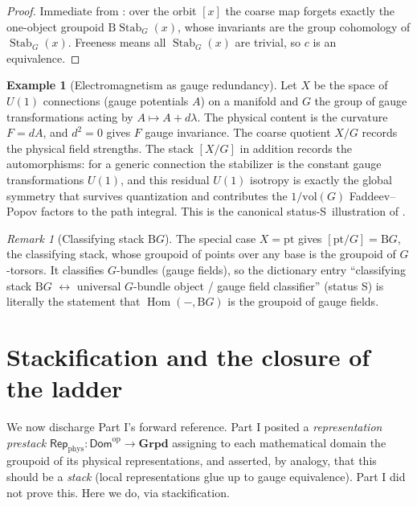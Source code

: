 \documentclass[12pt]{article}
\theoremstyle{definition}
\newtheorem{example}[theorem]{Example}
\theoremstyle{remark}
\newtheorem{remark}[theorem]{Remark}
\newcommand{\Dom}{\mathsf{Dom}}
\newcommand{\Grpd}{\mathbf{Grpd}}
\newcommand{\Repp}{\mathsf{Rep}_{\mathrm{phys}}}
\newcommand{\Stab}{\operatorname{Stab}}
\newcommand{\Hom}{\operatorname{Hom}}
\newcommand{\op}{\mathrm{op}}
\newcommand{\quot}[2]{[#1/#2]}
\newcommand{\Ss}{\textsf{S}}
\begin{document}
\begin{proof}
Immediate from : over the orbit $[x]$ the coarse map forgets exactly
the one-object groupoid $\mathrm{B}\Stab_G(x)$, whose invariants are the group
cohomology of $\Stab_G(x)$. Freeness means all $\Stab_G(x)$ are trivial, so $c$ is an
equivalence.
\end{proof}

\begin{example}[Electromagnetism as gauge redundancy]
\label{ex:em}
Let $X$ be the space of $U(1)$ connections (gauge potentials $A$) on a manifold and
$G$ the group of gauge transformations acting by $A\mapsto A+d\lambda$. The physical
content is the curvature $F=dA$, and $d^2=0$ gives $F$ gauge invariance. The coarse
quotient $X/G$ records the physical field strengths. The stack $\quot{X}{G}$ in
addition records the automorphisms: for a generic connection the stabilizer is the
constant gauge transformations $U(1)$, and this residual $U(1)$ isotropy is exactly the
global symmetry that survives quantization and contributes the $1/\mathrm{vol}(G)$
Faddeev--Popov factors to the path integral. This is the canonical status-\Ss\
illustration of .
\end{example}

\begin{remark}[Classifying stack $\mathrm{B}G$]
\label{rem:BG}
The special case $X=\mathrm{pt}$ gives $\quot{\mathrm{pt}}{G}=\mathrm{B}G$, the
classifying stack, whose groupoid of points over any base is the groupoid of
$G$-torsors. It classifies $G$-bundles (gauge fields), so the dictionary entry
``classifying stack $\mathrm{B}G$ $\leftrightarrow$ universal $G$-bundle object / gauge
field classifier'' (status \Ss) is literally the statement that
$\Hom(-,\mathrm{B}G)$ is the groupoid of gauge fields.
\end{remark}

\section{Stackification and the closure of the ladder}
\label{sec:closure}

We now discharge Part I's forward reference. Part I posited a \emph{representation
prestack} $\Repp:\Dom^{\op}\to\Grpd$ assigning to each mathematical domain the
groupoid of its physical representations, and asserted, by analogy, that this
should be a \emph{stack} (local representations glue up to gauge equivalence). Part I
did not prove this. Here we do, via stackification.
\end{document}

